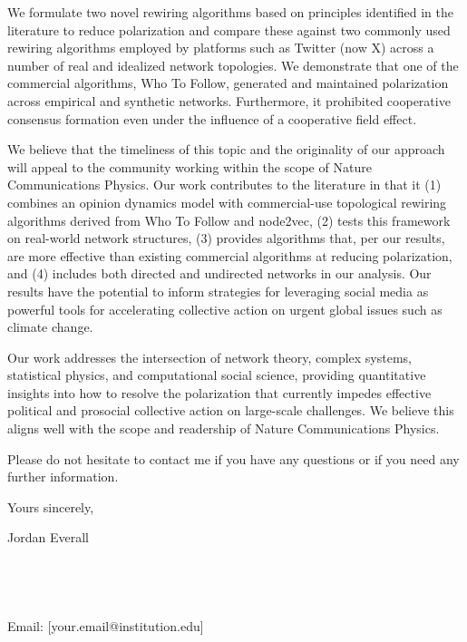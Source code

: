 \documentclass[a4paper,12pt]{letter}
\begin{document}
We formulate two novel rewiring algorithms based on principles identified in the literature to reduce polarization and compare these against two commonly used rewiring algorithms employed by platforms such as Twitter (now X) across a number of real and idealized network topologies. We demonstrate that one of the commercial algorithms, Who To Follow, generated and maintained polarization across empirical and synthetic networks. Furthermore, it prohibited cooperative consensus formation even under the influence of a cooperative field effect.

We believe that the timeliness of this topic and the originality of our approach will appeal to the community working within the scope of Nature Communications Physics. Our work contributes to the literature in that it (1) combines an opinion dynamics model with commercial-use topological rewiring algorithms derived from Who To Follow and node2vec, (2) tests this framework on real-world network structures, (3) provides algorithms that, per our results, are more effective than existing commercial algorithms at reducing polarization, and (4) includes both directed and undirected networks in our analysis. Our results have the potential to inform strategies for leveraging social media as powerful tools for accelerating collective action on urgent global issues such as climate change.

Our work addresses the intersection of network theory, complex systems, statistical physics, and computational social science, providing quantitative insights into how to resolve the polarization that currently impedes effective political and prosocial collective action on large-scale challenges. We believe this aligns well with the scope and readership of Nature Communications Physics.

Please do not hesitate to contact me if you have any questions or if you need any further information.

\vspace{1em}

\noindent
Yours sincerely,

\vspace{2em}

\noindent
Jordan Everall \\
[Your Position/Title] \\
[Your Department/Institute Name] \\
[Your Institution Name] \\
[City, Country] \\
Email: [your.email@institution.edu]
\end{document}
